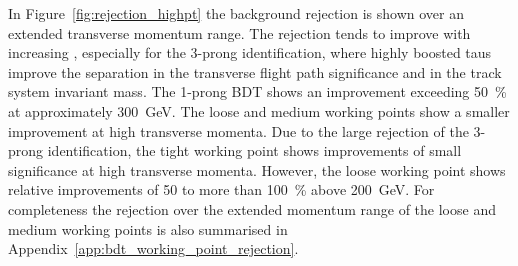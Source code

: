 In Figure~\ref{fig:rejection_highpt} the background rejection is shown over an
extended transverse momentum range. The rejection tends to improve with
increasing \tauhadvis \pt, especially for the 3-prong identification, where
highly boosted taus improve the separation in the transverse flight path
significance and in the track system invariant mass. The 1-prong BDT shows an
improvement exceeding \SI{50}{\percent} at approximately \SI{300}{\GeV}. The
loose and medium working points show a smaller improvement at high transverse
momenta. Due to the large rejection of the 3-prong identification, the tight
working point shows improvements of small significance at high transverse
momenta. However, the loose working point shows relative improvements of
\num{50} to more than \SI{100}{\percent} above \SI{200}{\GeV}. For completeness
the rejection over the extended momentum range of the loose and medium working
points is also summarised in Appendix~\ref{app:bdt_working_point_rejection}.

